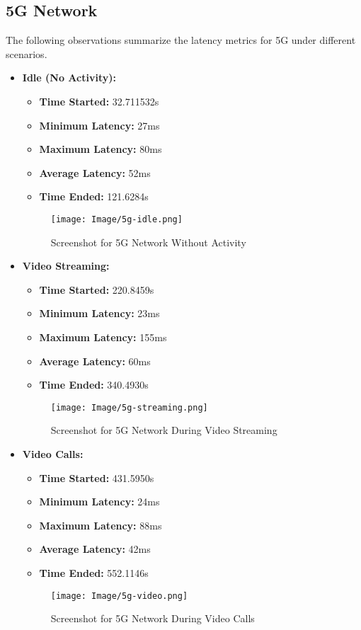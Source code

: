 \documentclass[conference]{IEEEtran}
\begin{document}
\subsection*{5G Network}
The following observations summarize the latency metrics for 5G under different scenarios.
\begin{itemize}
    \item \textbf{Idle (No Activity):}
    \begin{itemize}
        \item \textbf{Time Started:} 32.711532s
        \item \textbf{Minimum Latency:} 27ms
        \item \textbf{Maximum Latency:} 80ms
        \item \textbf{Average Latency:} 52ms
        \item \textbf{Time Ended:} 121.6284s
    \end{itemize}
    \begin{figure}[h]
        \centering
        \texttt{[image: Image/5g-idle.png]}
        \caption{Screenshot for 5G Network Without Activity}
        \label{fig:5g_idle}
    \end{figure}
\newpage
    \item \textbf{Video Streaming:}
    \begin{itemize}
        \item \textbf{Time Started:} 220.8459s
        \item \textbf{Minimum Latency:} 23ms
        \item \textbf{Maximum Latency:} 155ms
        \item \textbf{Average Latency:} 60ms
        \item \textbf{Time Ended:} 340.4930s
    \end{itemize}
    \begin{figure}[h]
        \centering
        \texttt{[image: Image/5g-streaming.png]}
        \caption{Screenshot for 5G Network During Video Streaming}
        \label{fig:5g_streaming}
    \end{figure}

    \item \textbf{Video Calls:}
    \begin{itemize}
        \item \textbf{Time Started:} 431.5950s
        \item \textbf{Minimum Latency:} 24ms
        \item \textbf{Maximum Latency:} 88ms
        \item \textbf{Average Latency:} 42ms
        \item \textbf{Time Ended:} 552.1146s
    \end{itemize}
    \begin{figure}[h]
        \centering
        \texttt{[image: Image/5g-video.png]}
        \caption{Screenshot for 5G Network During Video Calls}
        \label{fig:5g_calls}
    \end{figure}


\end{itemize}
\end{document}
